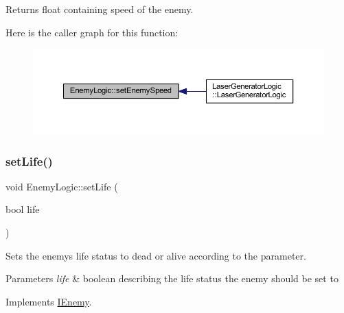 \begin{DoxyReturn}{Returns}
float containing speed of the enemy. 
\end{DoxyReturn}
Here is the caller graph for this function\+:\nopagebreak
\begin{figure}[H]
\begin{center}
\leavevmode
\includegraphics[width=350pt]{class_enemy_logic_aae66ecc1d28feaef7c814a0dff7eed95_icgraph}
\end{center}
\end{figure}
\mbox{\label{class_enemy_logic_a12bce0a6b6cad1af96aee3b401ea2c45}} 
\subsubsection{\texorpdfstring{set\+Life()}{setLife()}}
{\footnotesize\ttfamily void Enemy\+Logic\+::set\+Life (\begin{DoxyParamCaption}\item[{bool}]{life }\end{DoxyParamCaption})\hspace{0.3cm}{\ttfamily [virtual]}}



Sets the enemy\textquotesingle{}s life status to dead or alive according to the parameter. 


\begin{DoxyParams}{Parameters}
{\em life} & boolean describing the life status the enemy should be set to \\
\hline
\end{DoxyParams}


Implements \hyperlink{class_i_enemy_ab58f2f6c2a8c08730aaf8771f088e1bf}{I\+Enemy}.

\mbox{\label{class_enemy_logic_a0ac79ee7c0acf99b27aa4e22f98ce2d1}} 
